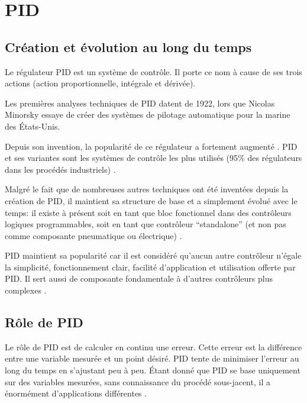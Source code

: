 
\section{PID}

\subsection{Création et évolution au long du temps}

Le régulateur PID est un système de contrôle.
Il porte ce nom à cause de ses trois actions (action proportionnelle, intégrale et dérivée).

Les premières analyses techniques de PID datent de 1922, lors que Nicolas Minorsky essaye de créer des systèmes de pilotage automatique pour la marine des États-Unis. \cite{minorsky1922directional}

Depuis son invention, la popularité de ce régulateur a fortement augmenté \cite{ang2005pid}.
PID et ses variantes sont les systèmes de contrôle les plus utilisés (95\% des régulateurs dans les procédés industriels) \cite{Kinnaert2013} \cite{Astrom2002}.

Malgré le fait que de nombreuses autres techniques ont été inventées depuis la création de PID, il maintient sa structure de base et a simplement évolué avec le temps:
il existe à présent soit en tant que bloc fonctionnel dans des contrôleurs logiques programmables, soit en tant que contrôleur ``standalone'' (et non pas comme composante pneumatique ou électrique) \cite{visioli2006practical}.

PID maintient sa popularité car il est considéré qu'aucun autre contrôleur n'égale la simplicité, fonctionnement clair, facilité d'application et utilisation offerte par PID.
Il sert aussi de composante fondamentale à d'autres contrôleurs plus complexes \cite{ang2005pid} \cite{visioli2006practical}.

\subsection{Rôle de PID}

Le rôle de PID est de calculer en continu une erreur.
Cette erreur est la différence entre une variable mesurée et un point désiré.
PID tente de minimiser l'erreur au long du temps en s'ajustant peu à peu.
Étant donné que PID se base uniquement sur des variables mesurées, sans connaissance du procédé sous-jacent, il a énormément d'applications différentes \cite{bennett1993history}.

